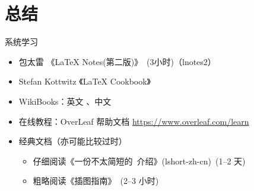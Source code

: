 
\section{总结}


\begin{frame}{系统学习}
  \begin{itemize}
      \item 包太雷 《\LaTeX{} Notes(第二版)》~(3小时)（lnotes2） 
      \item Stefan Kottwitz 《LaTeX Cookbook》
      \item WikiBooks：英文 、中文 
      \item 在线教程：OverLeaf 帮助文档 \url{https://www.overleaf.com/learn}
      \item 经典文档（亦可能比较过时）
        \begin{itemize}
          \item 仔细阅读《一份不太简短的~\LaTeXe 介绍》(lshort-zh-cn)~(1--2 天)
          \item 粗略阅读《\LaTeXe 插图指南》~(2--3 小时)
        \end{itemize}
  \end{itemize}
\end{frame}

